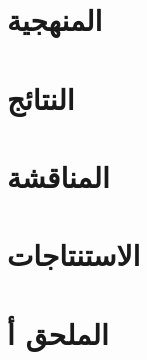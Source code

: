\documentclass[11pt,a4paper]{article}
\begin{document}

\section{المنهجية}
\label{sec:method}


\section{النتائج}
\label{sec:results}




\section{المناقشة}
\label{sec:discussion}


\section{الاستنتاجات}
\label{sec:conclusion}


\appendix
\section*{الملحق أ}


\printglossaries



\end{document}
